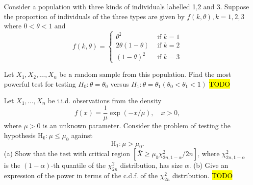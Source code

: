 \begin{example}
\label{exa:isi2008samplepsb10}Consider a population with three kinds
of individuals labelled 1,2 and 3. Suppose the proportion of individuals
of the three types are given by $f(k,\theta),k=1,2,3$ where $0<\theta<1$
and 
\[
f(k,\theta)=\begin{cases}
\theta^{2} & \text{ if }k=1\\
2\theta(1-\theta) & \text{ if }k=2\\
(1-\theta)^{2} & \text{ if }k=3
\end{cases}
\]

Let $X_{1},X_{2},\ldots,X_{n}$ be a random sample from this population.
Find the most powerful test for testing $H_{0}:\theta=\theta_{0}$
versus $H_{1}:\theta=\theta_{1}\left(\theta_{0}<\theta_{1}<1\right)$
\hl{TODO}
\end{example}

\begin{example}
	\label{exa:isi2009samplepsb8}
	Let $X_1, \ldots, X_n$ be i.i.d. observations from the density
	$$
	f(x)=\frac{1}{\mu} \exp (-x / \mu), \quad x>0,
	$$
	where $\mu>0$ is an unknown parameter.
	Consider the problem of testing the hypothesis $\mathrm{H}_0: \mu \leq \mu_0$ against
	$$
	\mathrm{H}_1: \mu>\mu_0 .
	$$
	(a) Show that the test with critical region $\left[\bar{X} \geq \mu_0 \chi_{2 n, 1-\alpha}^2 / 2 n\right]$, where $\chi_{2 n, 1-\alpha}^2$ is the $(1-\alpha)$-th quantile of the $\chi_{2 n}^2$ distribution, has size $\alpha$.
	(b) Give an expression of the power in terms of the c.d.f. of the $\chi_{2 n}^2$ distribution.
	\hl{TODO}
\end{example}


